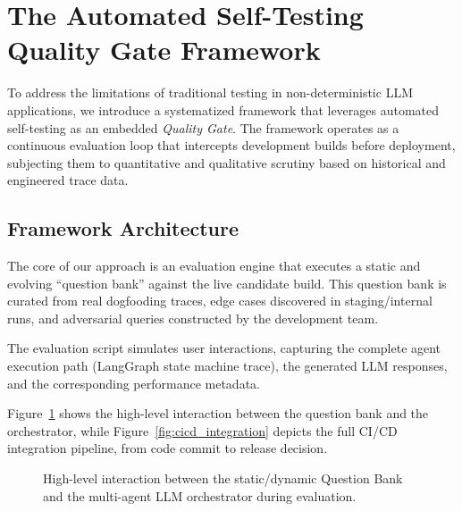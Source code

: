 \section{The Automated Self-Testing Quality Gate Framework}
\label{sec:framework}

To address the limitations of traditional testing in non-deterministic LLM applications, we introduce a systematized framework that leverages automated self-testing as an embedded \textit{Quality Gate}. The framework operates as a continuous evaluation loop that intercepts development builds before deployment, subjecting them to quantitative and qualitative scrutiny based on historical and engineered trace data.

\subsection{Framework Architecture}
The core of our approach is an evaluation engine that executes a static and evolving ``question bank'' against the live candidate build. This question bank is curated from real dogfooding traces, edge cases discovered in staging/internal runs, and adversarial queries constructed by the development team.

The evaluation script simulates user interactions, capturing the complete agent execution path (LangGraph state machine trace), the generated LLM responses, and the corresponding performance metadata.

Figure~\ref{fig:architecture} shows the high-level interaction between the question bank and the orchestrator, while Figure~\ref{fig:cicd_integration} depicts the full CI/CD integration pipeline, from code commit to release decision.

\begin{figure}[htbp]
\centering
{}
\caption{High-level interaction between the static/dynamic Question Bank and the multi-agent LLM orchestrator during evaluation.}
\label{fig:architecture}
\end{figure}

